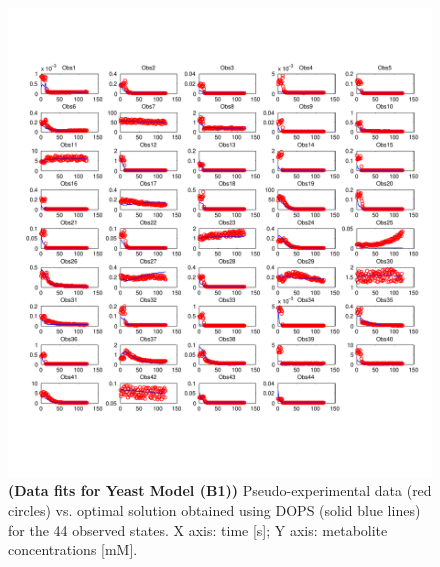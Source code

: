 \documentclass[12pt]{article}
\begin{document}
\renewcommand\thefigure{S\arabic{figure}}
\renewcommand\thetable{T\arabic{table}}
\renewcommand\thepage{S-\arabic{page}}
\renewcommand\theequation{S\arabic{equation}}

\setcounter{equation}{0}
\setcounter{table}{0}
\setcounter{figure}{0}
\setcounter{page}{1}


\begin{figure}[ht]
\centering
\includegraphics[width=1.00\textwidth]{./figs/Figure_S1_B1_sims.pdf}
\caption{\textbf {(Data fits for Yeast Model (B1))} Pseudo-experimental data (red circles) vs. optimal solution obtained using DOPS (solid blue lines) for the 44 observed states. X axis: time [s]; Y axis: metabolite concentrations [mM].
}\label{fig-sims-b1}
\end{figure}
\end{document}

